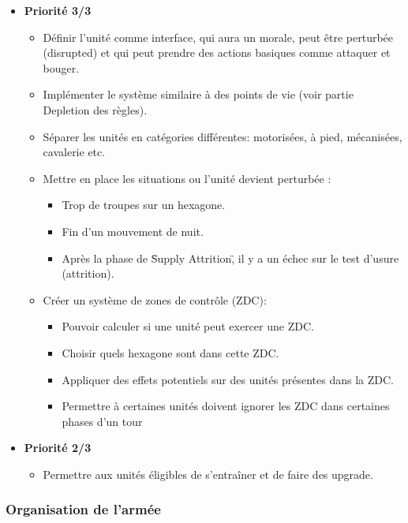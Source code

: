 \begin{itemize}
    \item \textbf{Priorité 3/3}
    \begin{itemize}
        \item Définir l'unité comme interface, qui aura un morale, peut être perturbée (disrupted) et qui peut prendre des actions basiques comme attaquer et bouger.\cmark
        \item Implémenter le système similaire à des points de vie (voir partie Depletion des règles).\cmark
        \item Séparer les unités en catégories différentes: motorisées, à pied, mécanisées, cavalerie etc.\cmark
        \item Mettre en place les situations ou l'unité devient perturbée :
        \begin{itemize}
            \item Trop de troupes sur un hexagone.
            \item Fin d'un mouvement de nuit.
            \item Après la phase de \"Supply Attrition\", il y a un échec sur le test d'usure (attrition).
        \end{itemize}
        \item Créer un système de zones de contrôle (ZDC):
        \begin{itemize}
            \item Pouvoir calculer si une unité peut exercer une ZDC.
            \item Choisir quels hexagone sont dans cette ZDC.
            \item Appliquer des effets potentiels sur des unités présentes dans la ZDC.
            \item Permettre à certaines unités doivent ignorer les ZDC dans certaines phases d'un tour
        \end{itemize}
    \end{itemize}
    \item \textbf{Priorité 2/3}
    \begin{itemize}
        \item Permettre aux unités éligibles de s'entraîner et de faire des upgrade.\xmark
    \end{itemize}
\end{itemize}

\subsubsection{Organisation de l'armée}


